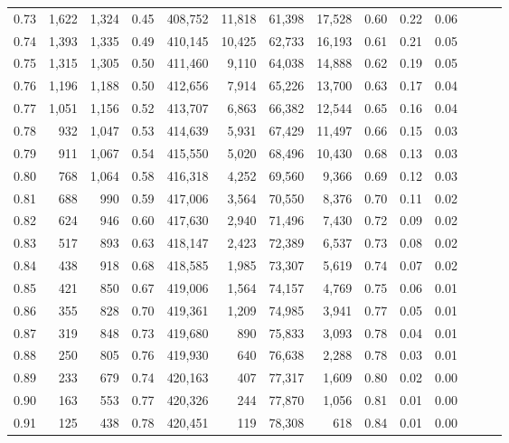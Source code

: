 \begin{tabular}{rrrrrrrrrrrrrr}
0.73 &  1,622 &  1,324 &  0.45 &  408,752 &   11,818 &  61,398 &  17,528 &  0.60 &  0.22 &      0.06 \\
0.74 &  1,393 &  1,335 &  0.49 &  410,145 &   10,425 &  62,733 &  16,193 &  0.61 &  0.21 &      0.05 \\
0.75 &  1,315 &  1,305 &  0.50 &  411,460 &    9,110 &  64,038 &  14,888 &  0.62 &  0.19 &      0.05 \\
0.76 &  1,196 &  1,188 &  0.50 &  412,656 &    7,914 &  65,226 &  13,700 &  0.63 &  0.17 &      0.04 \\
0.77 &  1,051 &  1,156 &  0.52 &  413,707 &    6,863 &  66,382 &  12,544 &  0.65 &  0.16 &      0.04 \\
0.78 &    932 &  1,047 &  0.53 &  414,639 &    5,931 &  67,429 &  11,497 &  0.66 &  0.15 &      0.03 \\
0.79 &    911 &  1,067 &  0.54 &  415,550 &    5,020 &  68,496 &  10,430 &  0.68 &  0.13 &      0.03 \\
0.80 &    768 &  1,064 &  0.58 &  416,318 &    4,252 &  69,560 &   9,366 &  0.69 &  0.12 &      0.03 \\
0.81 &    688 &    990 &  0.59 &  417,006 &    3,564 &  70,550 &   8,376 &  0.70 &  0.11 &      0.02 \\
0.82 &    624 &    946 &  0.60 &  417,630 &    2,940 &  71,496 &   7,430 &  0.72 &  0.09 &      0.02 \\
0.83 &    517 &    893 &  0.63 &  418,147 &    2,423 &  72,389 &   6,537 &  0.73 &  0.08 &      0.02 \\
0.84 &    438 &    918 &  0.68 &  418,585 &    1,985 &  73,307 &   5,619 &  0.74 &  0.07 &      0.02 \\
0.85 &    421 &    850 &  0.67 &  419,006 &    1,564 &  74,157 &   4,769 &  0.75 &  0.06 &      0.01 \\
0.86 &    355 &    828 &  0.70 &  419,361 &    1,209 &  74,985 &   3,941 &  0.77 &  0.05 &      0.01 \\
0.87 &    319 &    848 &  0.73 &  419,680 &      890 &  75,833 &   3,093 &  0.78 &  0.04 &      0.01 \\
0.88 &    250 &    805 &  0.76 &  419,930 &      640 &  76,638 &   2,288 &  0.78 &  0.03 &      0.01 \\
0.89 &    233 &    679 &  0.74 &  420,163 &      407 &  77,317 &   1,609 &  0.80 &  0.02 &      0.00 \\
0.90 &    163 &    553 &  0.77 &  420,326 &      244 &  77,870 &   1,056 &  0.81 &  0.01 &      0.00 \\
0.91 &    125 &    438 &  0.78 &  420,451 &      119 &  78,308 &     618 &  0.84 &  0.01 &      0.00 \\

\end{tabular}
